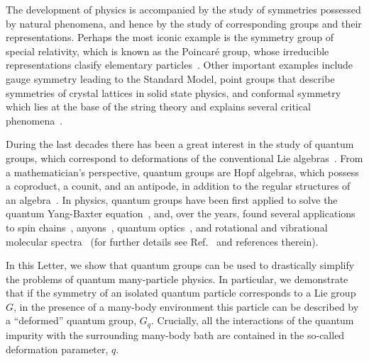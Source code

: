 \documentclass[aps,prl,reprint,showpacs,floatfix]{revtex4-1}
\begin{document}
The development of physics is accompanied by the study of symmetries possessed by natural phenomena, and hence by the study of corresponding groups and their representations. Perhaps the most iconic example is the symmetry group of special relativity, which is known as the Poincar\'{e} group, whose irreducible representations clasify elementary particles~\cite{weinberg1995quantum}. Other important examples include gauge symmetry leading to the Standard Model, point groups that describe symmetries of crystal lattices in solid state physics, and conformal symmetry which lies at the base of the string theory and explains several critical phenomena~\cite{cornwell1997group,pelissetto2002critical}. 

During the last decades there has been a great interest in the study of quantum groups, which correspond to deformations of the conventional Lie algebras~\cite{drinfeld1987proceedings,jimbo1986q,jimbo1990yang,kulish1981quantum}. From a mathematician's perspective, quantum groups are Hopf algebras, which possess a coproduct, a counit, and an antipode, in addition to the regular structures of an algebra~\cite{abe1977hopf}. In physics, quantum groups have been first applied to solve the quantum Yang-Baxter equation~\cite{jimbo1990yang}, and, over the years, found several  applications to spin chains~\cite{batchelor1990q}, anyons~\cite{lerda1993anyons,ubriaco1997anyonic}, quantum
optics~\cite{buvzek1992jaynes,chaichian1990quantum}, and rotational and vibrational molecular spectra~\cite{esteve1992q,raychev1995quantum} (for further details see Ref.~\cite{bonatsos1999quantum} and references therein).

In this Letter, we show that quantum groups can be used to drastically simplify the problems of quantum many-particle physics. In particular, we demonstrate that if the symmetry of an isolated quantum particle corresponds to a Lie group $G$, in the presence of a many-body environment this particle  can be described by a ``deformed'' quantum group, $G_q$. Crucially, all the interactions of the quantum impurity with the surrounding many-body bath are contained in the so-called deformation parameter, $q$.
\end{document}
